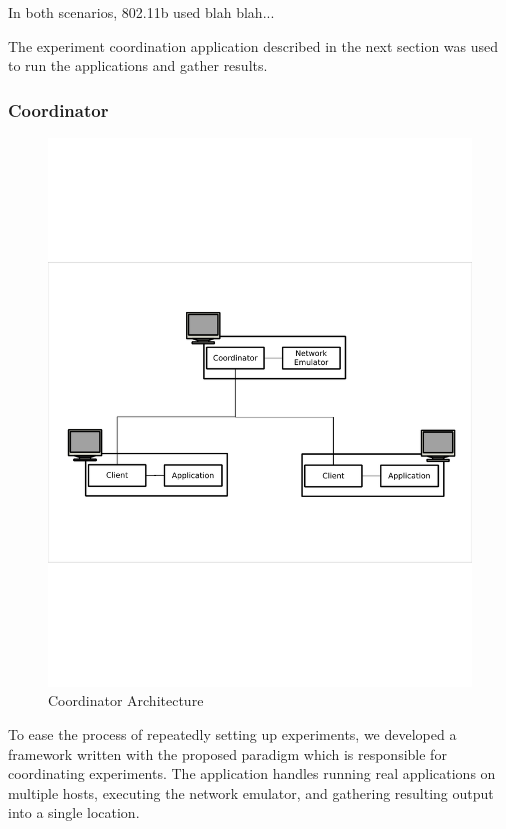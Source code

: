 \documentclass[lnicst]{svmultln}
\begin{document}
In both scenarios, 802.11b used blah blah...

The experiment coordination application described in the next section was used to run the applications and gather results.

\subsubsection{Coordinator}

\begin{figure}
\centering
\includegraphics[scale = .50, clip, trim = 10px 240px 10px 250px]{figures/experiment_arch.pdf}
\caption{Coordinator Architecture}
\label{fig:coordarchitecture}
\end{figure}

To ease the process of repeatedly setting up experiments, we developed a framework written with the proposed paradigm which is responsible for coordinating experiments. The application handles running real applications on multiple hosts, executing the network emulator, and gathering resulting output into a single location.
\end{document}
